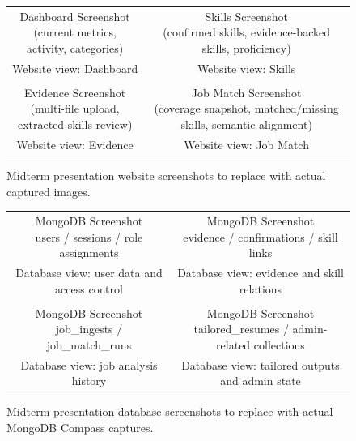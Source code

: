 \documentclass[11pt]{article}
\begin{document}
\begin{figure}[H]
  \centering
  \begin{tabular}{cc}
    \fbox{\parbox[c][2.1in][c]{0.42\linewidth}{\centering Dashboard Screenshot\\(current metrics, activity, categories)}} &
    \fbox{\parbox[c][2.1in][c]{0.42\linewidth}{\centering Skills Screenshot\\(confirmed skills, evidence-backed skills, proficiency)}} \\
    \small Website view: Dashboard & \small Website view: Skills \\
    \\[0.75em]
    \fbox{\parbox[c][2.1in][c]{0.42\linewidth}{\centering Evidence Screenshot\\(multi-file upload, extracted skills review)}} &
    \fbox{\parbox[c][2.1in][c]{0.42\linewidth}{\centering Job Match Screenshot\\(coverage snapshot, matched/missing skills, semantic alignment)}} \\
    \small Website view: Evidence & \small Website view: Job Match \\
  \end{tabular}
  \caption{Midterm presentation website screenshots to replace with actual captured images.}
\end{figure}

\begin{figure}[H]
  \centering
  \begin{tabular}{cc}
    \fbox{\parbox[c][2.1in][c]{0.42\linewidth}{\centering MongoDB Screenshot\\users / sessions / role assignments}} &
    \fbox{\parbox[c][2.1in][c]{0.42\linewidth}{\centering MongoDB Screenshot\\evidence / confirmations / skill links}} \\
    \small Database view: user data and access control & \small Database view: evidence and skill relations \\
    \\[0.75em]
    \fbox{\parbox[c][2.1in][c]{0.42\linewidth}{\centering MongoDB Screenshot\\job\_ingests / job\_match\_runs}} &
    \fbox{\parbox[c][2.1in][c]{0.42\linewidth}{\centering MongoDB Screenshot\\tailored\_resumes / admin-related collections}} \\
    \small Database view: job analysis history & \small Database view: tailored outputs and admin state \\
  \end{tabular}
  \caption{Midterm presentation database screenshots to replace with actual MongoDB Compass captures.}
\end{figure}
\end{document}
